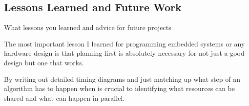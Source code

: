 \subsection{Lessons Learned and Future Work}
What lessons you learned and advice for future projects

The most important lesson I learned for programming embedded systems or any hardware design 
is that planning first is absolutely necessary for not just a good design but one that works. 

By writing out detailed timing diagrams and just matching up what step of an algorithm has to 
happen when is crucial to identifying what resources can be shared and what can happen in 
parallel. 
